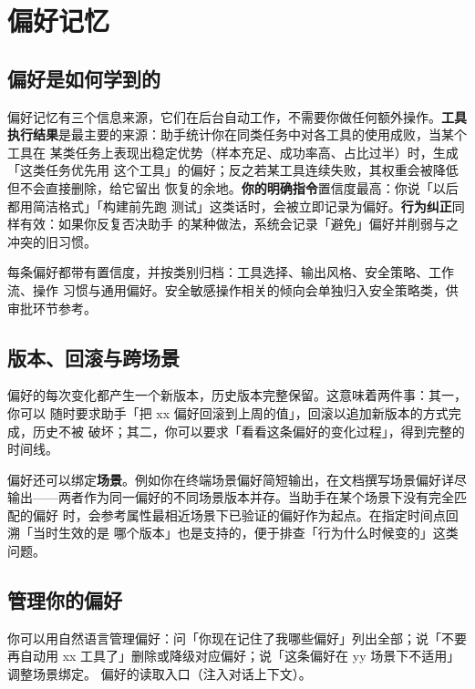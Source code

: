 \section{偏好记忆}\label{sec:pref}

\subsection{偏好是如何学到的}

偏好记忆有三个信息来源，它们在后台自动工作，不需要你做任何额外操作。\textbf{工具
执行结果}是最主要的来源：助手统计你在同类任务中对各工具的使用成败，当某个工具在
某类任务上表现出稳定优势（样本充足、成功率高、占比过半）时，生成「这类任务优先用
这个工具」的偏好；反之若某工具连续失败，其权重会被降低但不会直接删除，给它留出
恢复的余地。\textbf{你的明确指令}置信度最高：你说「以后都用简洁格式」「构建前先跑
测试」这类话时，会被立即记录为偏好。\textbf{行为纠正}同样有效：如果你反复否决助手
的某种做法，系统会记录「避免」偏好并削弱与之冲突的旧习惯。

每条偏好都带有置信度，并按类别归档：工具选择、输出风格、安全策略、工作流、操作
习惯与通用偏好。安全敏感操作相关的倾向会单独归入安全策略类，供审批环节参考。

\subsection{版本、回滚与跨场景}

偏好的每次变化都产生一个新版本，历史版本完整保留。这意味着两件事：其一，你可以
随时要求助手「把 xx 偏好回滚到上周的值」，回滚以追加新版本的方式完成，历史不被
破坏；其二，你可以要求「看看这条偏好的变化过程」，得到完整的时间线。

偏好还可以绑定\textbf{场景}。例如你在终端场景偏好简短输出，在文档撰写场景偏好详尽
输出——两者作为同一偏好的不同场景版本并存。当助手在某个场景下没有完全匹配的偏好
时，会参考属性最相近场景下已验证的偏好作为起点。在指定时间点回溯「当时生效的是
哪个版本」也是支持的，便于排查「行为什么时候变的」这类问题。

\subsection{管理你的偏好}

你可以用自然语言管理偏好：问「你现在记住了我哪些偏好」列出全部；说「不要再自动用
xx 工具了」删除或降级对应偏好；说「这条偏好在 yy 场景下不适用」调整场景绑定。
偏好的读取入口（注入对话上下文）。

